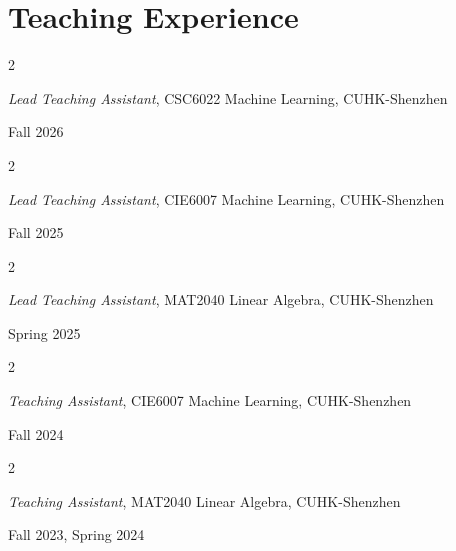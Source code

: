 \documentclass[10pt, letterpaper]{article}
\newenvironment{twocolentry}[2][]{
    \onecolentry
    \def\secondColumn{#2}
    \setcolumnwidth{\fill, 4 cm}
    \begin{paracol}{2}
}{
    \switchcolumn \raggedleft \secondColumn
    \end{paracol}
    \endonecolentry
} %
\begin{document}
\section{Teaching Experience}
\begin{twocolentry}{Fall 2026}
        \textit{Lead Teaching Assistant}, CSC6022 Machine Learning, CUHK-Shenzhen
    \end{twocolentry}
        \vspace{0.1cm}
    \begin{twocolentry}{Fall 2025}
        \textit{Lead Teaching Assistant}, CIE6007 Machine Learning, CUHK-Shenzhen
    \end{twocolentry}
        \vspace{0.1cm}
    \begin{twocolentry}{Spring 2025}
        \textit{Lead Teaching Assistant}, MAT2040 Linear Algebra, CUHK-Shenzhen
    \end{twocolentry}
    \vspace{0.1cm}
    \begin{twocolentry}{Fall 2024}
        \textit{Teaching Assistant}, CIE6007 Machine Learning, CUHK-Shenzhen
    \end{twocolentry}
    \vspace{0.1cm}
    \begin{twocolentry}{Fall 2023, Spring 2024}
        \textit{Teaching Assistant}, MAT2040 Linear Algebra, CUHK-Shenzhen
    \end{twocolentry}
\end{document}
